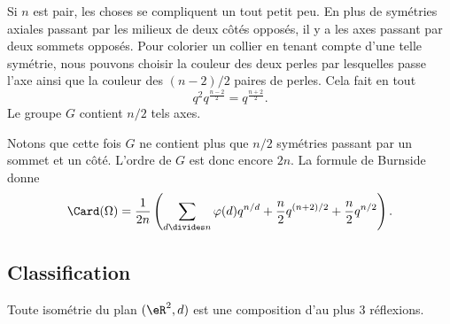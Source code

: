 Si \( n\) est pair, les choses se compliquent un tout petit peu. En plus de symétries axiales passant par les milieux de deux côtés opposés, il y a les axes passant par deux sommets opposés. Pour colorier un collier en tenant compte d'une telle symétrie, nous pouvons choisir la couleur des deux perles par lesquelles passe l'axe ainsi que la couleur des \( (n-2)/2\) paires de perles. Cela fait en tout
\begin{equation}
	q^2q^{\frac{ n-2 }{2}}=q^{\frac{ n+2 }{2}}.
\end{equation}
Le groupe \( G\) contient \( n/2\) tels axes.

Notons que cette fois \( G\) ne contient plus que \( n/2\) symétries passant par un sommet et un côté. L'ordre de \( G\) est donc encore \( 2n\). La formule de Burnside donne
\begin{equation}
	\Card(\Omega)=\frac{1}{ 2n }\left( \sum_{d\divides n}\varphi(d)q^{n/d}+\frac{ n }{2}q^{(n+2)/2}+\frac{ n }{2}q^{n/2} \right).
\end{equation}

\subsection{Classification}

\begin{theorem}      \label{THOooRORQooTDWFdv}
	Toute isométrie du plan \( (\eR^2,d)\) est une composition d'au plus \( 3\) réflexions.
\end{theorem}

